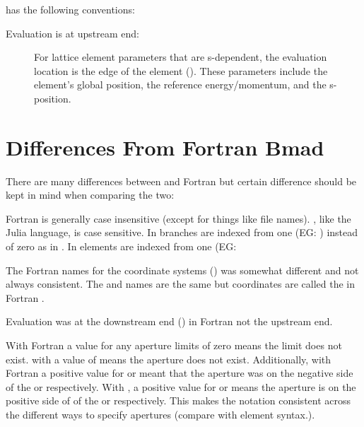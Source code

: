 \accellat has the following conventions:
\begin{description}
%
\item[Evaluation is at upstream end:] 
For lattice element parameters that are s-dependent, the evaluation location is the
 edge of the element (). These parameters include the 
element's global position, the reference energy/momentum, and the s-position.
%
\end{description}


\section{Differences From Fortran Bmad}

There are many differences between \accellat and Fortran \bmad but certain difference should
be kept in mind when comparing the two:
\begin{description}
\item
Fortran \bmad is generally case insensitive (except for things like file names). \accellat, like
the Julia language, is case sensitive.
%
In \accellat branches are indexed from one (EG: ) instead of zero as in \bmad.
%
In \accellat elements are indexed from one (EG: 
%
\item
The Fortran \bmad names for the coordinate systems () was somewhat different and not
always consistent. The  and  names are the same but 
coordinates are called the  in Fortran \bmad.
%
\item
Evaluation was at the downstream end () in Fortran \bmad not the upstream end.
%
\item
With Fortran \bmad a value for any aperture limits of zero means the limit does not exist.
with \accellat a value of  means the aperture does not exist. Additionally, with
Fortran \bmad a positive value for  or  meant that the aperture was
on the negative side of the  or  respectively. With \accellat, a positive
value for  or  means the aperture is on the positive side of 
of the  or  respectively. This makes the notation consistent across 
the different ways to specify apertures (compare with  element syntax.).
\end{description}



